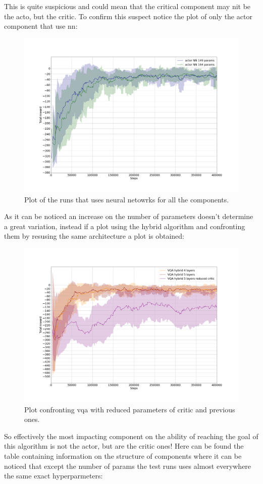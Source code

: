This is quite suspicious and could mean that the critical component may nit be the acto, but the critic. To confirm this suspect notice the plot of only the actor component that use \acrlong{nn}:
\begin{figure}[H]
	\centering
	\includegraphics[width=0.8\linewidth]{"img/classics actor"}
	\caption{Plot of the runs that uses neural netowrks for all the components.}
	\label{fig:classics-actor}
\end{figure}
As it can be noticed an increase on the number of parameters doesn't determine a great variation, instead if a plot using the hybrid algorithm and confronting them by resusing the same architecture a plot is obtained:
\begin{figure}[H]
	\centering
	\includegraphics[width=0.8\linewidth]{"img/VQA critic reduced"}
	\caption{Plot confronting vqa with reduced parameters of critic and previous ones.}
	\label{fig:vqa-critic-reduced}
\end{figure}
\vspace{0.5cm}
So effectively the most impacting component on the ability of reaching the goal of this algorithm is not the actor, but are the critic ones! Here can be found the table containing information on the structure of components where it can be noticed that except the number of params the test runs uses almost everywhere the same exact hyperparmeters:
